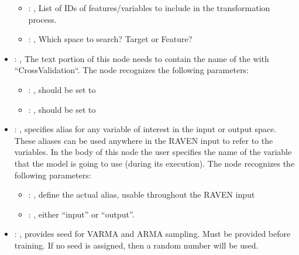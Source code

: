 \begin{itemize}
\begin{itemize}
        \item {}: , 
          List of IDs of features/variables to include in the transformation process.

        \item {}: , 
          Which space to search? Target or Feature?
      \end{itemize}

    \item {}: , 
      The text portion of this node needs to contain the name of the  with
               ``CrossValidation``.
      The  node recognizes the following parameters:
        \begin{itemize}
          \item {}: , 
            should be set to 
          \item {}: , 
            should be set to 
      \end{itemize}

    \item {}: , 
      specifies alias for         any variable of interest in the input or output space. These
      aliases can be used anywhere in the RAVEN input to         refer to the variables. In the body
      of this node the user specifies the name of the variable that the model is going to use
      (during its execution).
      The  node recognizes the following parameters:
        \begin{itemize}
          \item {}: , 
            define the actual alias, usable throughout the RAVEN input
          \item {}: , 
            either ``input'' or ``output''.
      \end{itemize}

    \item {}: , 
      provides seed for VARMA and ARMA sampling.
      Must be provided before training. If no seed is assigned,
      then a random number will be used.


\end{itemize}
